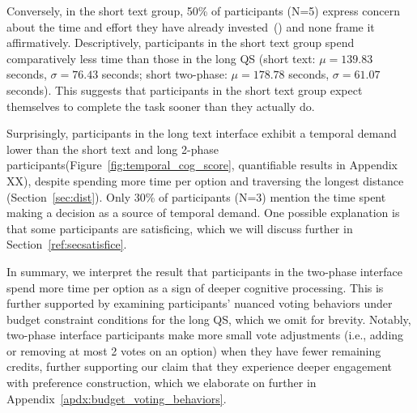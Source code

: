 Conversely, in the short text group, 50\% of participants (N=5) express concern about the time and effort they have already invested~() and none frame it affirmatively. Descriptively, participants in the short text group spend comparatively less time than those in the long QS (short text: $\mu=139.83$ seconds, $\sigma=76.43$ seconds; short two-phase: $\mu=178.78$ seconds, $\sigma=61.07$ seconds). This suggests that participants in the short text group expect themselves to complete the task sooner than they actually do. 

Surprisingly, participants in the long text interface exhibit a temporal demand lower than the short text and long 2-phase participants(Figure~\ref{fig:temporal_cog_score}, quantifiable results in Appendix XX), despite spending more time per option and traversing the longest distance (Section~\ref{sec:dist}). Only 30\% of participants (N=3) mention the time spent making a decision as a source of temporal demand. One possible explanation is that some participants are satisficing, which we will discuss further in Section~\ref{ref:secsatisfice}.  

In summary, we interpret the result that participants in the two-phase interface spend more time per option as a sign of deeper cognitive processing. This is further supported by examining participants' nuanced voting behaviors under budget constraint conditions for the long QS, which we omit for brevity. Notably, two-phase interface participants make more small vote adjustments (i.e., adding or removing at most 2 votes on an option) when they have fewer remaining credits, further supporting our claim that they experience deeper engagement with preference construction, which we elaborate on further in Appendix~\ref{apdx:budget_voting_behaviors}.
